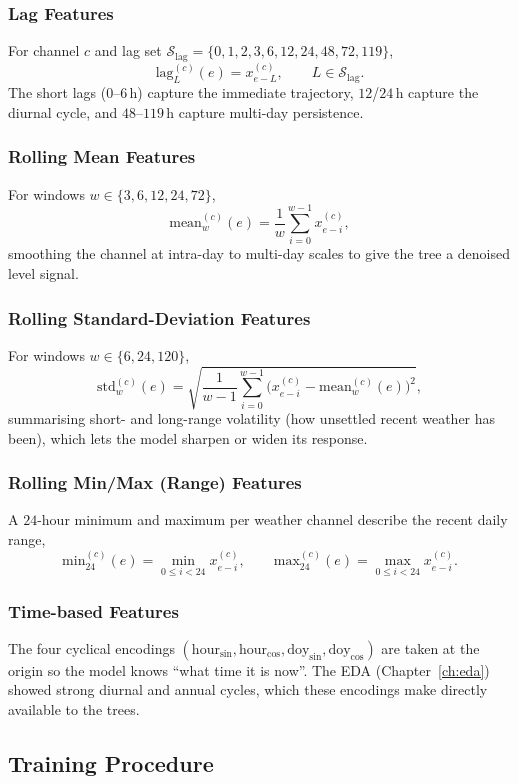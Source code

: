 \documentclass[12pt,a4paper,oneside]{report}
\begin{document}
\subsubsection{Lag Features}
For channel $c$ and lag set $\mathcal{S}_{\text{lag}} = \{0,1,2,3,6,12,24,48,72,119\}$,
\[
  \text{lag}^{(c)}_{L}(e) = x^{(c)}_{e-L}, \qquad L \in \mathcal{S}_{\text{lag}}.
\]
The short lags ($0$--$6$\,h) capture the immediate trajectory, $12$/$24$\,h capture
the diurnal cycle, and $48$--$119$\,h capture multi-day persistence.

\subsubsection{Rolling Mean Features}
For windows $w \in \{3,6,12,24,72\}$,
\[
  \text{mean}^{(c)}_{w}(e) = \frac{1}{w}\sum_{i=0}^{w-1} x^{(c)}_{e-i},
\]
smoothing the channel at intra-day to multi-day scales to give the tree a denoised
level signal.

\subsubsection{Rolling Standard-Deviation Features}
For windows $w \in \{6,24,120\}$,
\[
  \text{std}^{(c)}_{w}(e) =
  \sqrt{\frac{1}{w-1}\sum_{i=0}^{w-1}\big(x^{(c)}_{e-i} - \text{mean}^{(c)}_{w}(e)\big)^2},
\]
summarising short- and long-range volatility (how unsettled recent weather has
been), which lets the model sharpen or widen its response.

\subsubsection{Rolling Min/Max (Range) Features}
A $24$-hour minimum and maximum per weather channel describe the recent daily
range,
\[
  \text{min}^{(c)}_{24}(e) = \min_{0 \le i < 24} x^{(c)}_{e-i},
  \qquad
  \text{max}^{(c)}_{24}(e) = \max_{0 \le i < 24} x^{(c)}_{e-i}.
\]

\subsubsection{Time-based Features}
The four cyclical encodings $(\text{hour}_{\sin}, \text{hour}_{\cos},
\text{doy}_{\sin}, \text{doy}_{\cos})$ are taken at the origin so the model knows
``what time it is now''. The EDA (Chapter~\ref{ch:eda}) showed strong diurnal and
annual cycles, which these encodings make directly available to the trees.

\subsection{Training Procedure}
\label{sec:xgb-train}
\end{document}
